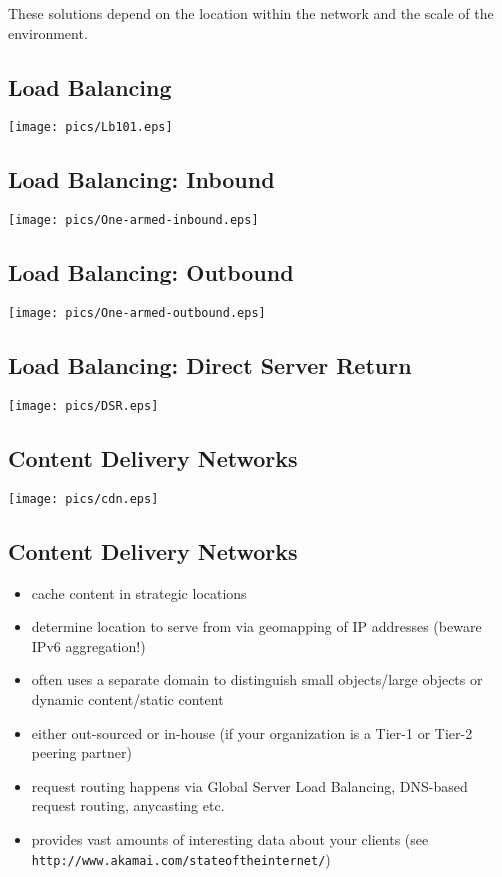 \documentclass[xga]{xdvislides}
\begin{document}
These solutions depend on the location within the network and the scale of
the environment.

\subsection{Load Balancing}
\begin{center}
	\texttt{[image: pics/Lb101.eps]}
\end{center}

\subsection{Load Balancing: Inbound}
\begin{center}
	\texttt{[image: pics/One-armed-inbound.eps]}
\end{center}

\subsection{Load Balancing: Outbound}
\begin{center}
	\texttt{[image: pics/One-armed-outbound.eps]}
\end{center}

\subsection{Load Balancing: Direct Server Return}
\begin{center}
	\texttt{[image: pics/DSR.eps]}
\end{center}

\subsection{Content Delivery Networks}
\begin{center}
	\texttt{[image: pics/cdn.eps]}
\end{center}

\subsection{Content Delivery Networks}
\begin{itemize}
	\item cache content in strategic locations
	\item determine location to serve from via geomapping of IP
		addresses (beware IPv6 aggregation!)
	\item often uses a separate domain to distinguish small
		objects/large objects or dynamic content/static content
	\item either out-sourced or in-house (if your organization is a
		Tier-1 or Tier-2 peering partner)
	\item request routing happens via Global Server Load Balancing,
		DNS-based request routing, anycasting etc.
	\item provides vast amounts of interesting data about your clients
		(see \verb+http://www.akamai.com/stateoftheinternet/+)
\end{itemize}
\end{document}
